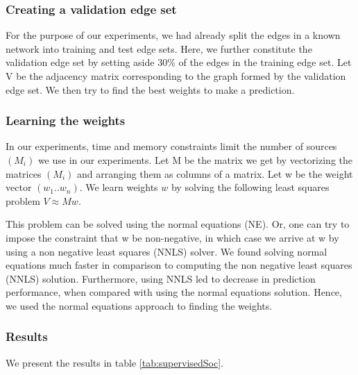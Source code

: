 \documentclass{report}
\begin{document}
\subsubsection{Creating a validation edge set}
For the purpose of our experiments, we had already split the edges in a known network into training and test edge sets. Here, we further constitute the validation edge set by setting aside 30\% of the edges in the training edge set. Let V be the adjacency matrix corresponding to the graph formed by the validation edge set. We then try to find the best weights to make a prediction.

\subsubsection{Learning the weights}
In our experiments, time and memory constraints limit the number of sources $(M_i)$ we use in our experiments. Let M be the matrix we get by vectorizing the matrices $(M_i)$ and arranging them as columns of a matrix. Let w be the weight vector $(w_1 .. w_n)$. We learn weights $w$ by solving the following least squares problem $V \approx Mw$.

This problem can be solved using the normal equations (NE). Or, one can try to impose the constraint that w be non-negative, in which case we arrive at w by using a non negative least squares (NNLS) solver. We found solving normal equations much faster in comparison to computing the non negative least squares (NNLS) solution. Furthermore, using NNLS led to decrease in prediction performance, when compared with using the normal equations solution. Hence, we used the normal equations approach to finding the weights.


\subsubsection{Results}
We present the results in table \ref{tab:supervisedSoc}.
\end{document}
